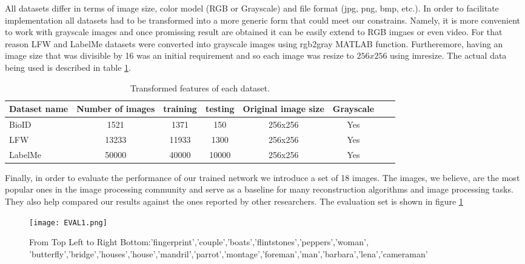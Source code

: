 All datasets differ in terms of image size, color model (RGB or Grayscale) and file format (jpg, png, bmp, etc.). In order to facilitate implementation all datasets had to be transformed into a more generic form that could meet our constrains. Namely, it is more convenient to work with grayscale images and once promissing result are obtained it can be easily extend to RGB imgaes or even video. For that reason LFW and LabelMe datasets were converted into grayscale images using rgb2gray MATLAB function. Furtheremore, having an image size that was divisible by 16 was an initial requirement and so each image was resize to $256x256$ using imresize. The actual data being used is described in table \ref{tab:datasets2}.   
\begin{table}[tb]
\caption[Transformed datasets for training and testing]{Transformed features of each dataset.}
\label{tab:datasets2}
\centering
\begin{tabular}{l*{6}{c}r}
Dataset name              & Number of images & training & testing &  Original image size& Grayscale \\
\hline
BioID   & 1521 & 1371 & 150 & 256x256 & Yes\\
LFW     & 13233 & 11933 & 1300 & 256x256 & Yes\\
LabelMe & 50000 & 40000 & 10000 & 256x256 & Yes\\
\bottomrule 
\end{tabular}  
\end{table}

Finally, in order to evaluate the performance of our trained network we introduce a set of 18 images. The images, we believe, are the most popular ones in the image processing community and serve as a baseline for many reconstruction algorithms and image processing tasks. They also help compared our results against the ones reported by other researchers. The evaluation set is shown in figure \ref{fig:EVALim1}
\begin{figure}[tb] 
\centering 
\texttt{[image: EVAL1.png]} 
\caption[Evaluation images]{From Top Left to Right Bottom:'fingerprint','couple','boats','flintstones','peppers','woman',
'butterfly','bridge','houses','house','mandril','parrot','montage','foreman','man','barbara','lena','cameraman'}
\label{fig:EVALim1} 
\end{figure}


